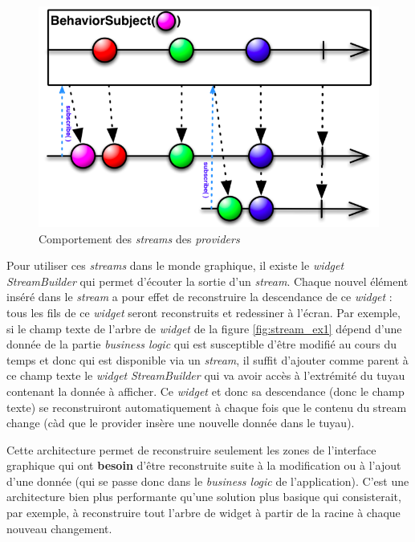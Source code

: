 \begin{figure}[H]
  \includegraphics[width=.7\linewidth]{content/imgs/stream.png}
  \caption{Comportement des \textit{streams} des \textit{providers}}
  \label{fig:stream}
\end{figure}

Pour utiliser ces \textit{streams} dans le monde graphique, il existe le \textit{widget} \textit{StreamBuilder} qui permet d'écouter la sortie d'un \textit{stream}. Chaque nouvel élément inséré dans le \textit{stream} a pour effet de reconstruire la descendance de ce \textit{widget} : tous les fils de ce \textit{widget} seront reconstruits et redessiner à l'écran. Par exemple, si le champ texte de l'arbre de \textit{widget} de la figure \ref{fig:stream_ex1} dépend d'une donnée de la partie \textit{business logic} qui est susceptible d'être modifié au cours du temps et donc qui est disponible via un \textit{stream}, il suffit d'ajouter comme parent à ce champ texte le \textit{widget} \textit{StreamBuilder} qui va avoir accès à l'extrémité du tuyau contenant la donnée à afficher. Ce \textit{widget} et donc sa descendance (donc le champ texte) se reconstruiront automatiquement à chaque fois que le contenu du stream change (càd que le provider insère une nouvelle donnée dans le tuyau).

Cette architecture permet de reconstruire seulement les zones de l'interface graphique qui ont \textbf{besoin} d'être reconstruite suite à la modification ou à l'ajout d'une donnée (qui se passe donc dans le \textit{business logic} de l'application). C'est une architecture bien plus performante qu'une solution plus basique qui consisterait, par exemple, à reconstruire tout l'arbre de widget à partir de la racine à chaque nouveau changement.

